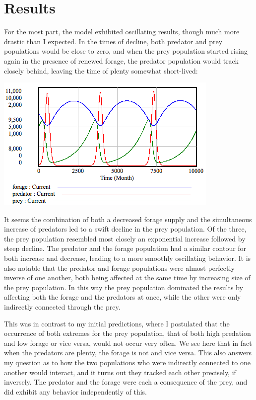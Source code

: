 \documentclass[12pt]{article}
\begin{document}
\section{Results}

For the most part, the model exhibited oscillating results, though much more drastic than I expected.  In the times of decline, both predator and prey populations would be close to zero, and when the prey population started rising again in the presence of renewed forage, the predator population would track closely behind, leaving the time of plenty somewhat short-lived:

\includegraphics[scale=0.8]{modelbehavior.png}

It seems the combination of both a decreased forage supply and the simultaneous increase of predators led to a swift decline in the prey population.  Of the three, the prey population resembled most closely an exponential increase followed by steep decline.  The predator and the forage population had a similar contour for both increase and decrease, leading to a more smoothly oscillating behavior.  It is also notable that the predator and forage populations were almost perfectly inverse of one another, both being affected at the same time by increasing size of the prey population.  In this way the prey population dominated the results by affecting both the forage and the predators at once, while the other were only indirectly connected through the prey.  

This was in contrast to my initial predictions, where I postulated that the occurrence of both extremes for the prey population, that of both high predation and low forage or vice versa, would not occur very often.  We see here that in fact when the predators are plenty, the forage is not and vice versa.  This also answers my question as to how the two populations who were indirectly connected to one another would interact, and it turns out they tracked each other precisely, if inversely.  The predator and the forage were each a consequence of the prey, and did exhibit any behavior independently of this.  
\end{document}
